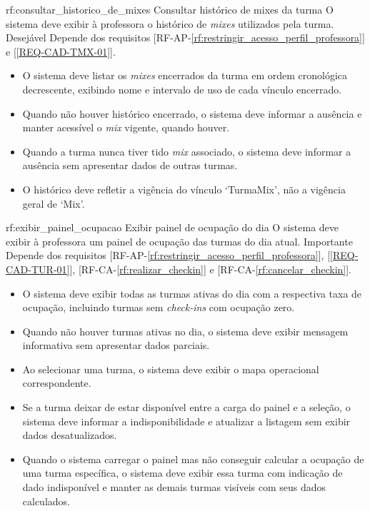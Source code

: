 \reqfuncfull
{rf:consultar_historico_de_mixes}
{Consultar histórico de mixes da turma}
{O sistema deve exibir à professora o histórico de \textit{mixes} utilizados pela turma.}
{Desejável}
{Depende dos requisitos [RF-AP-\ref{rf:restringir_acesso_perfil_professora}] e [\ref{REQ-CAD-TMX-01}].}
{\begin{itemize}[leftmargin=0.6cm]
    \item O sistema deve listar os \textit{mixes} encerrados da turma em ordem cronológica decrescente, exibindo nome e intervalo de uso de cada vínculo encerrado.
    \item Quando não houver histórico encerrado, o sistema deve informar a ausência e manter acessível o \textit{mix} vigente, quando houver.
    \item Quando a turma nunca tiver tido \textit{mix} associado, o sistema deve informar a ausência sem apresentar dados de outras turmas.
    \item O histórico deve refletir a vigência do vínculo `TurmaMix', não a vigência geral de `Mix'.
\end{itemize}}

\reqfuncfull
{rf:exibir_painel_ocupacao}
{Exibir painel de ocupação do dia}
{O sistema deve exibir à professora um painel de ocupação das turmas do dia atual.}
{Importante}
{Depende dos requisitos [RF-AP-\ref{rf:restringir_acesso_perfil_professora}], [\ref{REQ-CAD-TUR-01}], [RF-CA-\ref{rf:realizar_checkin}] e [RF-CA-\ref{rf:cancelar_checkin}].}
{\begin{itemize}[leftmargin=0.6cm]
    \item O sistema deve exibir todas as turmas ativas do dia com a respectiva taxa de ocupação, incluindo turmas sem \textit{check-ins} com ocupação zero.
    \item Quando não houver turmas ativas no dia, o sistema deve exibir mensagem informativa sem apresentar dados parciais.
    \item Ao selecionar uma turma, o sistema deve exibir o mapa operacional correspondente.
    \item Se a turma deixar de estar disponível entre a carga do painel e a seleção, o sistema deve informar a indisponibilidade e atualizar a listagem sem exibir dados desatualizados.
    \item Quando o sistema carregar o painel mas não conseguir calcular a ocupação de uma turma específica, o sistema deve exibir essa turma com indicação de dado indisponível e manter as demais turmas visíveis com seus dados calculados.
\end{itemize}}

